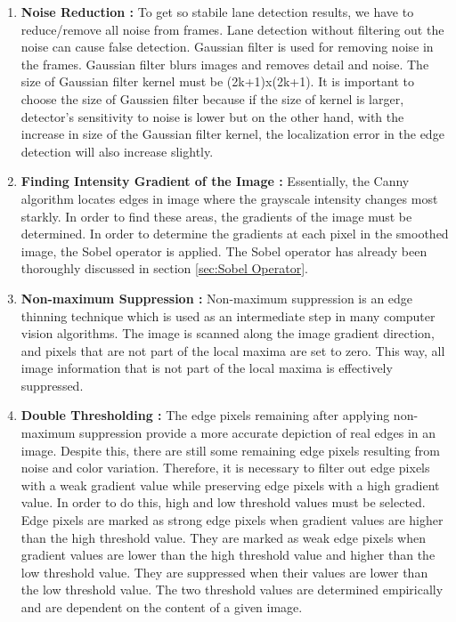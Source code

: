 \begin{enumerate}
\item \textbf{Noise Reduction : } To get so stabile lane detection results, we have to reduce/remove all noise from frames. Lane detection without filtering out the noise can cause false detection. Gaussian filter is used for removing noise in the frames. Gaussian filter blurs images and removes detail and noise. The size of Gaussian filter kernel must be (2k+1)x(2k+1). It is important to choose the size of Gaussien filter because if the size of kernel is larger, detector's sensitivity to noise is lower but on the other hand, with the increase in size of the Gaussian filter kernel, the localization error in the edge detection will also increase slightly. \cite{Canny_Edge_Detector}



\item \textbf{Finding Intensity Gradient of the Image : } Essentially, the Canny algorithm locates edges in image where the grayscale intensity changes most starkly. In order to find these areas, the gradients of the image must be determined. In order to determine the gradients at each pixel in the smoothed image, the Sobel operator is applied. The Sobel operator has already been thoroughly discussed in section \ref{sec:Sobel Operator}.

\item \textbf{Non-maximum Suppression : } Non-maximum suppression is an edge thinning technique which is used as an intermediate step in many computer vision algorithms. The image is scanned along the image gradient direction, and pixels that are not part of the local maxima are set to zero. This way, all image information that is not part of the local maxima is effectively suppressed.

\item \textbf{Double Thresholding : } The edge pixels remaining after applying non-maximum suppression provide a more accurate depiction of real edges in an image. Despite this, there are still some remaining edge pixels resulting from noise and color variation. Therefore, it is necessary to filter out edge pixels with a weak gradient value while preserving edge pixels with a high gradient value. In order to do this, high and low threshold values must be selected. Edge pixels are marked as strong edge pixels when gradient values are higher than the high threshold value. They are marked as weak edge pixels when gradient values are lower than the high threshold value and higher than the low threshold value. They are suppressed when their values are lower than the low threshold value. The two threshold values are determined empirically and are dependent on the content of a given image.



\end{enumerate}
